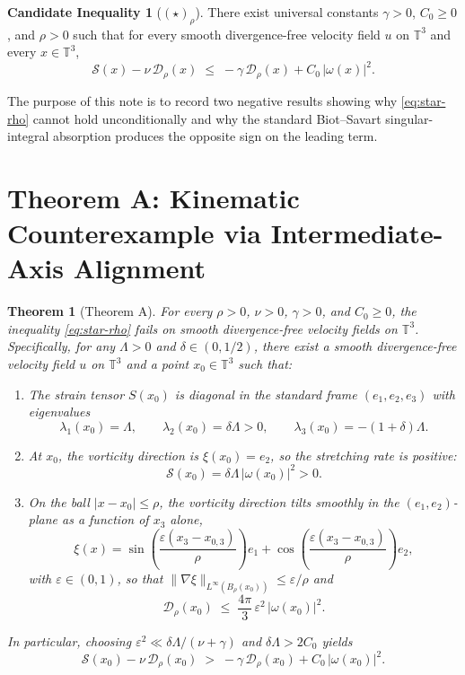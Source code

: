 \documentclass[11pt]{amsart}
\newtheorem{theorem}{Theorem}
\theoremstyle{definition}
\newtheorem{conjecture}{Candidate Inequality}
\begin{document}
\begin{conjecture}[$(\star)_\rho$]
There exist universal constants $\gamma>0$, $C_0\ge 0$, and $\rho>0$ such that for every smooth divergence-free velocity field $u$ on $\mathbb{T}^3$ and every $x\in\mathbb{T}^3$,
\begin{equation}\label{eq:star-rho}
  \mathcal{S}(x)-\nu\,\mathcal{D}_\rho(x)\;\le\;-\gamma\,\mathcal{D}_\rho(x)+C_0\,|\omega(x)|^2.
  \tag{$\star_\rho$}
\end{equation}
\end{conjecture}

The purpose of this note is to record two negative results showing why \eqref{eq:star-rho} cannot hold unconditionally and why the standard Biot--Savart singular-integral absorption produces the opposite sign on the leading term.

\section{Theorem A: Kinematic Counterexample via Intermediate-Axis Alignment}

\begin{theorem}[Theorem A]\label{thm:A}
For every $\rho>0$, $\nu>0$, $\gamma>0$, and $C_0\ge 0$, the inequality \eqref{eq:star-rho} fails on smooth divergence-free velocity fields on $\mathbb{T}^3$. Specifically, for any $\Lambda>0$ and $\delta\in(0,1/2)$, there exist a smooth divergence-free velocity field $u$ on $\mathbb{T}^3$ and a point $x_0\in\mathbb{T}^3$ such that:
\begin{enumerate}
  \item The strain tensor $S(x_0)$ is diagonal in the standard frame $(e_1,e_2,e_3)$ with eigenvalues
  \[
    \lambda_1(x_0)=\Lambda,\qquad \lambda_2(x_0)=\delta\Lambda>0,\qquad \lambda_3(x_0)=-(1+\delta)\Lambda.
  \]
  \item At $x_0$, the vorticity direction is $\xi(x_0)=e_2$, so the stretching rate is positive:
  \[
    \mathcal{S}(x_0)=\delta\Lambda\,|\omega(x_0)|^2>0.
  \]
  \item On the ball $|x-x_0|\le\rho$, the vorticity direction tilts smoothly in the $(e_1,e_2)$-plane as a function of $x_3$ alone,
  \[
    \xi(x)=\sin\!\left(\frac{\varepsilon(x_3-x_{0,3})}{\rho}\right)e_1+\cos\!\left(\frac{\varepsilon(x_3-x_{0,3})}{\rho}\right)e_2,
  \]
  with $\varepsilon\in(0,1)$, so that $\|\nabla\xi\|_{L^\infty(B_\rho(x_0))}\le\varepsilon/\rho$ and
  \[
    \mathcal{D}_\rho(x_0)\;\le\;\frac{4\pi}{3}\,\varepsilon^2\,|\omega(x_0)|^2.
  \]
\end{enumerate}
In particular, choosing $\varepsilon^2\ll \delta\Lambda/(\nu+\gamma)$ and $\delta\Lambda>2C_0$ yields
\[
  \mathcal{S}(x_0)-\nu\,\mathcal{D}_\rho(x_0)\;>\;-\gamma\,\mathcal{D}_\rho(x_0)+C_0\,|\omega(x_0)|^2.
\]
\end{theorem}
\end{document}
